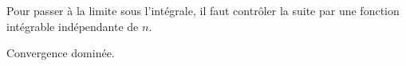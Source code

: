Pour passer à la limite sous l'intégrale, il faut contrôler la suite par une
fonction intégrable indépendante de $n$.
\begin{theorem}
  Convergence dominée.
\end{theorem}
